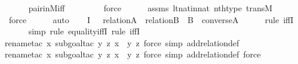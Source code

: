 \begin{isabellebody}
\ \ \ \ \isamarkupfalse%
\ pair{\isacharunderscore}{\kern0pt}in{\isacharunderscore}{\kern0pt}M{\isacharunderscore}{\kern0pt}iff\isanewline
\ \ \ \ \ \ \ \isamarkupfalse%
\ force\isanewline
\ \ \ \ \isamarkupfalse%
\ assms\ lt{\isacharunderscore}{\kern0pt}nat{\isacharunderscore}{\kern0pt}in{\isacharunderscore}{\kern0pt}nat\ nth{\isacharunderscore}{\kern0pt}type\ transM\ \isanewline
\ \ \ \ \ \isamarkupfalse%
\ force\isanewline
\ \ \ \ \isamarkupfalse%
\ auto\isanewline
\ \ \isamarkupfalse%
\ I{}{\isacharcolon}{\kern0pt}\ {\isachardoublequoteopen}{\isachardot}{\kern0pt}{\isachardot}{\kern0pt}{\isachardot}{\kern0pt}\ {\isasymlongleftrightarrow}\ relation{\isacharparenleft}{\kern0pt}A{\isacharparenright}{\kern0pt}\ {\isasymand}\ relation{\isacharparenleft}{\kern0pt}B{\isacharparenright}{\kern0pt}\ {\isasymand}\ B\ {\isacharequal}{\kern0pt}\ converse{\isacharparenleft}{\kern0pt}A{\isacharparenright}{\kern0pt}{\isachardoublequoteclose}\isanewline
\ \ \ \ \isamarkupfalse%
\ {\isacharparenleft}{\kern0pt}rule\ iffI{\isacharparenright}{\kern0pt}\isanewline
\ \ \ \ \ \isamarkupfalse%
{\isacharparenleft}{\kern0pt}simp{\isacharcomma}{\kern0pt}\ rule\ equality{\isacharunderscore}{\kern0pt}iffI{\isacharcomma}{\kern0pt}\ rule\ iffI{\isacharparenright}{\kern0pt}\isanewline
\ \ \ \ \ \ \isamarkupfalse%
{\isacharparenleft}{\kern0pt}rename{\isacharunderscore}{\kern0pt}tac\ x{\isacharcomma}{\kern0pt}\ subgoal{\isacharunderscore}{\kern0pt}tac\ {\isachardoublequoteopen}{\isasymexists}y\ z{\isachardot}{\kern0pt}\ x\ {\isacharequal}{\kern0pt}\ {\isacharless}{\kern0pt}y{\isacharcomma}{\kern0pt}\ z{\isachargreater}{\kern0pt}{\isachardoublequoteclose}{\isacharcomma}{\kern0pt}\ force{\isacharcomma}{\kern0pt}\ simp\ add{\isacharcolon}{\kern0pt}relation{\isacharunderscore}{\kern0pt}def{\isacharparenright}{\kern0pt}\isanewline
\ \ \ \ \ \isamarkupfalse%
{\isacharparenleft}{\kern0pt}rename{\isacharunderscore}{\kern0pt}tac\ x{\isacharcomma}{\kern0pt}\ subgoal{\isacharunderscore}{\kern0pt}tac\ {\isachardoublequoteopen}{\isasymexists}y\ z{\isachardot}{\kern0pt}\ x\ {\isacharequal}{\kern0pt}\ {\isacharless}{\kern0pt}y{\isacharcomma}{\kern0pt}\ z{\isachargreater}{\kern0pt}{\isachardoublequoteclose}{\isacharcomma}{\kern0pt}\ force{\isacharcomma}{\kern0pt}\ simp\ add{\isacharcolon}{\kern0pt}relation{\isacharunderscore}{\kern0pt}def{\isacharcomma}{\kern0pt}\ force{\isacharparenright}{\kern0pt}\isanewline
\ \ \ \ \isamarkupfalse%

\end{isabellebody}
